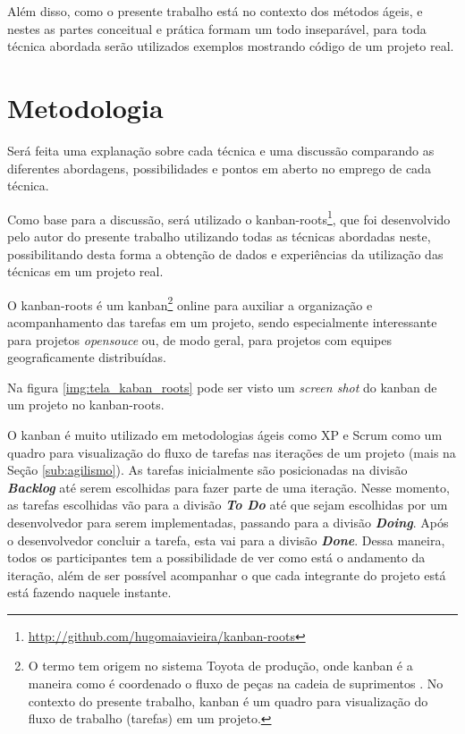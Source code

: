Além disso, como o presente trabalho está no contexto dos métodos ágeis, e nestes as partes conceitual e prática formam um todo inseparável, para toda técnica abordada serão utilizados exemplos mostrando código de um projeto real.

\section{Metodologia}

Será feita uma explanação sobre cada técnica e uma discussão comparando as diferentes abordagens, possibilidades e pontos em aberto no emprego de cada técnica.

Como base para a discussão, será utilizado o kanban-roots\footnote{\url{http://github.com/hugomaiavieira/kanban-roots}}, que foi desenvolvido pelo autor do presente trabalho utilizando todas as técnicas abordadas neste, possibilitando desta forma a obtenção de dados e experiências da utilização das técnicas em um projeto real.

O kanban-roots é um kanban\footnote{O termo tem origem no sistema Toyota de produção, onde kanban é a maneira como é coordenado o fluxo de peças na cadeia de suprimentos  \cite{AMaquinaQueMudouOMundo}. No contexto do presente trabalho, kanban é um quadro para visualização do fluxo de trabalho (tarefas) em um projeto.} online para auxiliar a organização e acompanhamento das tarefas em um projeto, sendo especialmente interessante para projetos \textit{opensouce} ou, de modo geral, para projetos com equipes geograficamente distribuídas.

Na figura \ref{img:tela_kaban_roots} pode ser visto um \textit{screen shot} do kanban de um projeto no kanban-roots.

O kanban é muito utilizado em metodologias ágeis como XP e Scrum como um quadro para visualização do fluxo de tarefas nas iterações de um projeto (mais na Seção \ref{sub:agilismo}). As tarefas inicialmente são posicionadas na divisão \textbf{\textit{Backlog}} até serem escolhidas para fazer parte de uma iteração. Nesse momento, as tarefas escolhidas vão para a divisão \textbf{\textit{To Do}} até que sejam escolhidas por um desenvolvedor para serem implementadas, passando para a divisão \textbf{\textit{Doing}}. Após o desenvolvedor concluir a tarefa, esta vai para a divisão \textbf{\textit{Done}}. Dessa maneira, todos os participantes tem a possibilidade de ver como está o andamento da iteração, além de ser possível acompanhar o que cada integrante do projeto está está fazendo naquele instante.

